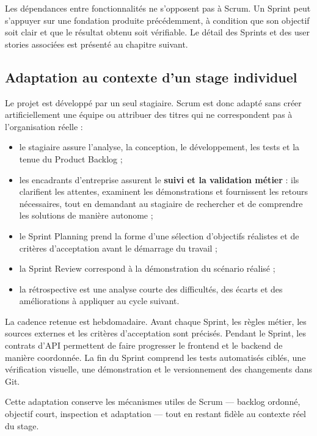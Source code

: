 Les dépendances entre fonctionnalités ne s'opposent pas à Scrum. Un Sprint peut
s'appuyer sur une fondation produite précédemment, à condition que son objectif soit
clair et que le résultat obtenu soit vérifiable. Le détail des Sprints et des user
stories associées est présenté au chapitre suivant.

\subsection{Adaptation au contexte d'un stage individuel}

Le projet est développé par un seul stagiaire. Scrum est donc adapté sans créer
artificiellement une équipe ou attribuer des titres qui ne correspondent pas à
l'organisation réelle :

\begin{itemize}[leftmargin=7mm]
  \item le stagiaire assure l'analyse, la conception, le développement, les tests et
  la tenue du Product Backlog ;
  \item les encadrants d'entreprise assurent le \textbf{suivi et la validation métier} :
  ils clarifient les attentes, examinent les démonstrations et fournissent les retours
  nécessaires, tout en demandant au stagiaire de rechercher et de comprendre les
  solutions de manière autonome ;
  \item le Sprint Planning prend la forme d'une sélection d'objectifs réalistes et de
  critères d'acceptation avant le démarrage du travail ;
  \item la Sprint Review correspond à la démonstration du scénario réalisé ;
  \item la rétrospective est une analyse courte des difficultés, des écarts et des
  améliorations à appliquer au cycle suivant.
\end{itemize}

La cadence retenue est hebdomadaire. Avant chaque Sprint, les règles métier, les
sources externes et les critères d'acceptation sont précisés. Pendant le Sprint, les
contrats d'API permettent de faire progresser le frontend et le backend de manière
coordonnée. La fin du Sprint comprend les tests automatisés ciblés, une vérification
visuelle, une démonstration et le versionnement des changements dans Git.

Cette adaptation conserve les mécanismes utiles de Scrum --- backlog ordonné,
objectif court, inspection et adaptation --- tout en restant fidèle au contexte
réel du stage.

